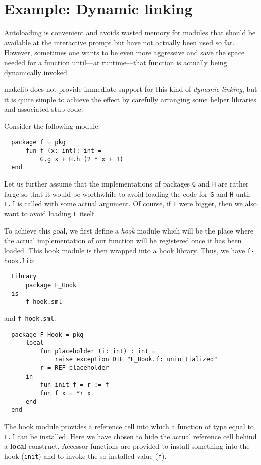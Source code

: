 
\section{Example: Dynamic linking}
\label{sec:dynlink}

Autoloading is convenient and avoids wasted memory for modules that
should be available at the interactive prompt but have not actually
been used so far.  However, sometimes one wants to be even more
aggressive and save the space needed for a function until---at
runtime---that function is actually being dynamically invoked.

makelib does not provide immediate support for this kind of {\em dynamic
linking}, but it is quite simple to achieve the effect by carefully
arranging some helper libraries and associated stub code.

Consider the following module:
\begin{verbatim}
  package f = pkg
      fun f (x: int): int =
          G.g x + H.h (2 * x + 1)
  end
\end{verbatim}

Let us further assume that the implementations of packages {\tt G}
and {\tt H} are rather large so that it would be worthwhile to avoid
loading the code for {\tt G} and {\tt H} until {\tt F.f} is called
with some actual argument.  Of course, if {\tt F} were bigger, then we
also want to avoid loading {\tt F} itself.

To achieve this goal, we first define a {\em hook} module which will
be the place where the actual implementation of our function will be
registered once it has been loaded.  This hook module is then wrapped
into a hook library.  Thus, we have {\tt f-hook.lib}:
\begin{verbatim}
  Library
      package F_Hook
  is
      f-hook.sml
\end{verbatim}

and {\tt f-hook.sml}:

\begin{verbatim}
  package F_Hook = pkg
      local
          fun placeholder (i: int) : int =
              raise exception DIE "F_Hook.f: uninitialized"
          r = REF placeholder
      in
          fun init f = r := f
          fun f x = *r x
      end
  end
\end{verbatim}

The hook module provides a reference cell into which a function of
type equal to {\tt F.f} can be installed.  Here we have chosen to hide
the actual reference cell behind a {\bf local} construct.  Accessor
functions are provided to install something into the hook
({\tt init}) and to invoke the so-installed value ({\tt f}).

